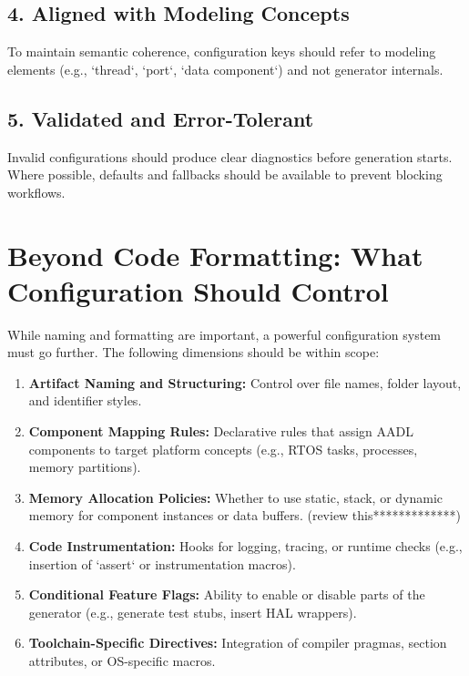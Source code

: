 \subsection*{4. Aligned with Modeling Concepts}

To maintain semantic coherence, configuration keys should refer to modeling elements (e.g., `thread`, `port`, `data component`) and not generator internals.

\subsection*{5. Validated and Error-Tolerant}

Invalid configurations should produce clear diagnostics before generation starts. Where possible, defaults and fallbacks should be available to prevent blocking workflows.

\section{Beyond Code Formatting: What Configuration Should Control}
\label{sec:config_scope}

While naming and formatting are important, a powerful configuration system must go further. The following dimensions should be within scope:

\begin{enumerate}
	\item \textbf{Artifact Naming and Structuring:} Control over file names, folder layout, and identifier styles.
	\item \textbf{Component Mapping Rules:} Declarative rules that assign AADL components to target platform concepts (e.g., RTOS tasks, processes, memory partitions).
	\item \textbf{Memory Allocation Policies:} Whether to use static, stack, or dynamic memory for component instances or data buffers. (review this*************)
	\item \textbf{Code Instrumentation:} Hooks for logging, tracing, or runtime checks (e.g., insertion of `assert` or instrumentation macros).
	\item \textbf{Conditional Feature Flags:} Ability to enable or disable parts of the generator (e.g., generate test stubs, insert HAL wrappers).
	\item \textbf{Toolchain-Specific Directives:} Integration of compiler pragmas, section attributes, or OS-specific macros.
\end{enumerate}

